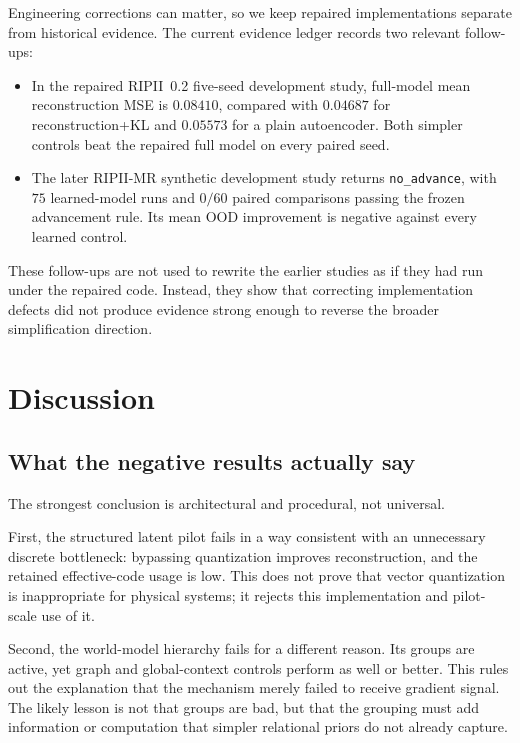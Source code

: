 \documentclass[10pt]{article}
\newcommand{\RIPII}{\textsc{RIPII}}
\begin{document}
Engineering corrections can matter, so we keep repaired implementations separate from historical evidence. The current evidence ledger records two relevant follow-ups:

\begin{itemize}
    \item In the repaired \RIPII\ 0.2 five-seed development study, full-model mean reconstruction MSE is $0.08410$, compared with $0.04687$ for reconstruction+KL and $0.05573$ for a plain autoencoder. Both simpler controls beat the repaired full model on every paired seed.
    \item The later \RIPII-MR synthetic development study returns \texttt{no\_advance}, with $75$ learned-model runs and $0/60$ paired comparisons passing the frozen advancement rule. Its mean OOD improvement is negative against every learned control.
\end{itemize}

These follow-ups are not used to rewrite the earlier studies as if they had run under the repaired code. Instead, they show that correcting implementation defects did not produce evidence strong enough to reverse the broader simplification direction.

\section{Discussion}

\subsection{What the negative results actually say}

The strongest conclusion is architectural and procedural, not universal.

First, the structured latent pilot fails in a way consistent with an unnecessary discrete bottleneck: bypassing quantization improves reconstruction, and the retained effective-code usage is low. This does not prove that vector quantization is inappropriate for physical systems; it rejects this implementation and pilot-scale use of it.

Second, the world-model hierarchy fails for a different reason. Its groups are active, yet graph and global-context controls perform as well or better. This rules out the explanation that the mechanism merely failed to receive gradient signal. The likely lesson is not that groups are bad, but that the grouping must add information or computation that simpler relational priors do not already capture.
\end{document}
